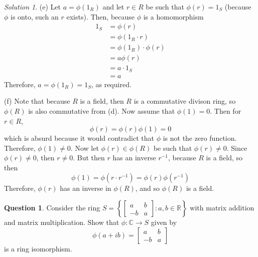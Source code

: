 \documentclass[11pt]{amsart}
\theoremstyle{definition}\newtheorem{question}{Question}
\theoremstyle{definition}\newtheorem{claim}{Claim}
\theoremstyle{remark}\newtheorem*{solution}{Solution}
\newcommand{\C}{\mathbb{C}}
\newcommand{\R}{\mathbb{R}}
\begin{document}
\begin{solution}
    (e) Let $a = \phi(1_R)$ and let $r \in R$ be such that $\phi(r) = 1_S$ (because $\phi$ is onto, such an $r$ exists). Then, because $\phi$ is a homomorphism
    \begin{align*}
        1_S &= \phi(r) \\
        &= \phi(1_R \cdot r) \\
        &= \phi(1_R) \cdot \phi(r) \\
        &= a\phi(r) \\
        &= a \cdot 1_S \\
        &= a
    \end{align*}
    Therefore, $a = \phi(1_R) = 1_S$, as required.

    (f) Note that because $R$ is a field, then $R$ is a commutative divison ring, so $\phi(R)$ is also commutative from (d). Now assume that $\phi(1) = 0$. Then for $r \in R$,
    \begin{equation*}
        \phi(r) = \phi(r)\phi(1) = 0
    \end{equation*}
    which is absurd because it would contradict that $\phi$ is not the zero function. Therefore, $\phi(1) \neq 0$. Now let $\phi(r) \in \phi(R)$ be such that $\phi(r) \neq 0$. Since $\phi(r) \neq 0$, then $r \neq 0$. But then $r$ has an inverse $r^{-1}$, because $R$ is a field, so then
    \begin{equation*}
        \phi(1) = \phi(r \cdot r^{-1}) = \phi(r) \phi(r^{-1})
    \end{equation*}
    Therefore, $\phi(r)$ has an inverse in $\phi(R)$, and so $\phi(R)$ is a field.
\end{solution}

\newpage

\begin{question}
    Consider the ring $S = \left\{\begin{bmatrix} a & b \\ -b & a \end{bmatrix} : a, b \in \R\right\}$ with matrix addition and matrix multiplication. Show that $\phi : \C \to S$ given by
    \begin{equation*}
        \phi(a + ib) = \begin{bmatrix} a & b \\ -b & a \end{bmatrix}
    \end{equation*}
    is a ring isomorphism.
\end{question}
\end{document}
